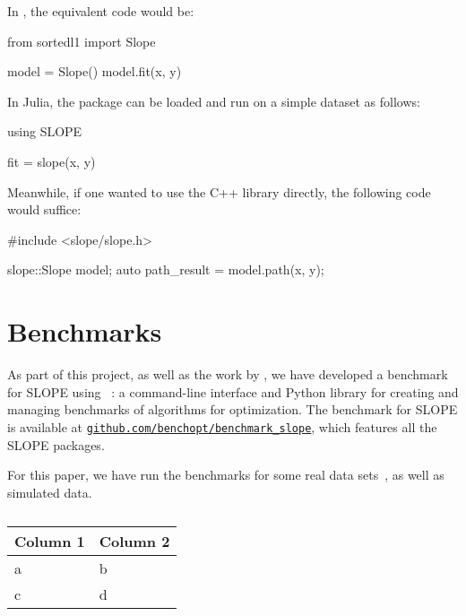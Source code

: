 \documentclass[article]{jss}
\let\Cref\crtCref
\newcommand{\myurl}[1]{\href{https://#1}{\nolinkurl{#1}}}
\begin{document}
In , the equivalent code would be:
\begin{Code}
  from sortedl1 import Slope

  model = Slope()
  model.fit(x, y)
\end{Code}

In Julia, the package can be loaded and run on a simple dataset as follows:
\begin{Code}
  using SLOPE

  fit = slope(x, y)
\end{Code}

Meanwhile, if one wanted to use the C++ library directly, the following code
would suffice:
\begin{Code}
  #include <slope/slope.h>

  slope::Slope model;
  auto path_result = model.path(x, y);
\end{Code}

\section{Benchmarks}

As part of this project, as well as the work by \citet{larsson2023}, we have
developed a benchmark for SLOPE using ~\citep{moreau2022a}: a
command-line interface and Python library for creating and managing
benchmarks of algorithms for optimization. The benchmark for
SLOPE is available at \myurl{github.com/benchopt/benchmark\_slope}, which
features all the SLOPE packages.

For this paper, we have run the benchmarks for some real data sets~\Cref{tab:real-datasets},
as well as simulated data.

\begin{table}[htpb]
  \centering
  \caption{}
  \label{tab:real-datasets}
  \begin{tabular}{ll}
    \toprule
    Column 1 & Column 2 \\
    \midrule
    a        & b        \\
    c        & d        \\
    \bottomrule
  \end{tabular}
\end{table}
\end{document}

